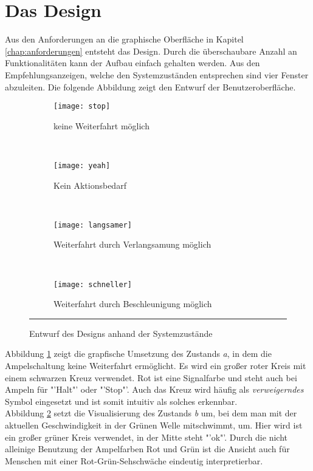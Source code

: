 \section{Das Design}
Aus den Anforderungen an die graphische Oberfläche in Kapitel \ref{chap:anforderungen} entsteht das Design. Durch die überschaubare Anzahl an Funktionalitäten kann der Aufbau einfach gehalten werden. Aus den Empfehlungsanzeigen, welche den Systemzuständen entsprechen sind vier Fenster abzuleiten. Die folgende Abbildung zeigt den Entwurf der Benutzeroberfläche.
\begin{figure}[H]
        \centering
           \begin{subfigure}[t]{0.23\textwidth}
                \texttt{[image: stop]}
                \caption[Systemzustand a]{keine Weiterfahrt möglich}
                \label{fig:stop}
        \end{subfigure}
           ~ 
              \begin{subfigure}[t]{0.23\textwidth}
                \texttt{[image: yeah]}
                \caption[Systemzustand b]{Kein Aktionsbedarf}
                \label{fig:yeah}
        \end{subfigure}
           ~
        \begin{subfigure}[t]{0.23\textwidth}
                \texttt{[image: langsamer]}
                \caption[Systemzustand c]{Weiterfahrt durch Verlangsamung  möglich}
                \label{fig:langsamer}
        \end{subfigure}
        ~
        \begin{subfigure}[t]{0.23\textwidth}
                \texttt{[image: schneller]}
                \caption[Systemzustand d]{Weiterfahrt durch Beschleunigung möglich}
                \label{fig:schneller}
        \end{subfigure}  
        \rule{35em}{0.5pt}   
        \caption[Systemzustände im Ampelbereich]{Entwurf des Designs anhand der Systemzustände}
        \label{fig:mockup}
\end{figure} 
Abbildung \ref{fig:stop} zeigt die grapfische Umsetzung des Zustands \textit{a}, in dem die Ampelschaltung keine Weiterfahrt ermöglicht. Es wird ein großer roter Kreis mit einem schwarzen Kreuz verwendet. Rot ist eine Signalfarbe und steht auch bei Ampeln für "'Halt"' oder "'Stop"'. Auch das Kreuz wird häufig als \textit{verweigerndes} Symbol eingesetzt und ist somit intuitiv als solches erkennbar.\\
Abbildung \ref{fig:yeah} setzt die Visualisierung des Zustands \textit{b} um, bei dem man mit der aktuellen Geschwindigkeit in der Grünen Welle mitschwimmt, um. Hier wird ist ein großer grüner Kreis verwendet, in der Mitte steht "'ok"'. Durch die nicht alleinige Benutzung der Ampelfarben Rot und Grün ist die Ansicht auch für Menschen mit einer Rot-Grün-Sehschwäche eindeutig interpretierbar.\\
